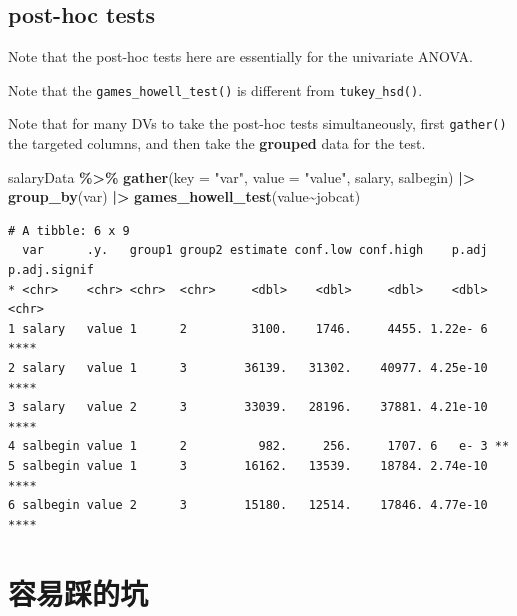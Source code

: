 \documentclass[
]{ctexart}
\newenvironment{Shaded}{\begin{snugshade}}{\end{snugshade}}
\newcommand{\AttributeTok}[1]{\textcolor[rgb]{0.13,0.29,0.53}{#1}}
\newcommand{\FunctionTok}[1]{\textcolor[rgb]{0.13,0.29,0.53}{\textbf{#1}}}
\newcommand{\NormalTok}[1]{#1}
\newcommand{\SpecialCharTok}[1]{\textcolor[rgb]{0.81,0.36,0.00}{\textbf{#1}}}
\newcommand{\StringTok}[1]{\textcolor[rgb]{0.31,0.60,0.02}{#1}}
\begin{document}
\hypertarget{post-hoc-tests}{%
\subsection{post-hoc tests}\label{post-hoc-tests}}

Note that the post-hoc tests here are essentially for the univariate
ANOVA.

Note that the \texttt{games\_howell\_test()} is different from
\texttt{tukey\_hsd()}.

Note that for many DVs to take the post-hoc tests simultaneously, first
\texttt{gather()} the targeted columns, and then take the
\textbf{grouped} data for the test.

\begin{Shaded}
\begin{Highlighting}[]
\NormalTok{salaryData }\SpecialCharTok{\%\textgreater{}\%} \FunctionTok{gather}\NormalTok{(}\AttributeTok{key =} \StringTok{"var"}\NormalTok{, }
                      \AttributeTok{value =} \StringTok{"value"}\NormalTok{, }
\NormalTok{                      salary, salbegin) }\SpecialCharTok{|\textgreater{}} 
  \FunctionTok{group\_by}\NormalTok{(var) }\SpecialCharTok{|\textgreater{}}
  \FunctionTok{games\_howell\_test}\NormalTok{(value}\SpecialCharTok{\textasciitilde{}}\NormalTok{jobcat) }
\end{Highlighting}
\end{Shaded}

\begin{verbatim}
# A tibble: 6 x 9
  var      .y.   group1 group2 estimate conf.low conf.high    p.adj p.adj.signif
* <chr>    <chr> <chr>  <chr>     <dbl>    <dbl>     <dbl>    <dbl> <chr>       
1 salary   value 1      2         3100.    1746.     4455. 1.22e- 6 ****        
2 salary   value 1      3        36139.   31302.    40977. 4.25e-10 ****        
3 salary   value 2      3        33039.   28196.    37881. 4.21e-10 ****        
4 salbegin value 1      2          982.     256.     1707. 6   e- 3 **          
5 salbegin value 1      3        16162.   13539.    18784. 2.74e-10 ****        
6 salbegin value 2      3        15180.   12514.    17846. 4.77e-10 ****        
\end{verbatim}

\hypertarget{ux5bb9ux6613ux8e29ux7684ux5751}{%
\section{容易踩的坑}\label{ux5bb9ux6613ux8e29ux7684ux5751}}
\end{document}
